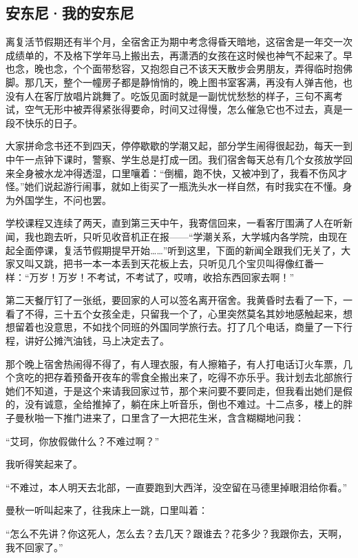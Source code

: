 \subsection{安东尼·我的安东尼}


\par 离复活节假期还有半个月，全宿舍正为期中考念得昏天暗地，这宿舍是一年交一次成绩单的，不及格下学年马上搬出去，再潇洒的女孩在这时候也神气不起来了。早也念，晚也念，个个面带愁容，又抱怨自己不该天天散步会男朋友，弄得临时抱佛脚。那几天，整个一幢房子都是静悄悄的，晚上图书室客满，再没有人弹吉他，也没有人在客厅放唱片跳舞了。吃饭见面时就是一副忧忧愁愁的样子，三句不离考试，空气无形中被弄得紧张得要命，时间又过得慢，怎么催急它也不过去，真是一段不快乐的日子。
\par 大家拼命念书还不到四天，停停歇歇的学潮又起，部分学生闹得很起劲，每天一到中午一点钟下课时，警察、学生总是打成一团。我们宿舍每天总有几个女孩放学回来全身被水龙冲得透湿，口里嚷着：“倒楣，跑不快，又被冲到了，我看不伤风才怪。”她们说起游行闹事，就如上街买了一瓶洗头水一样自然，有时我实在不懂。身为外国学生，不问也罢。
\par 学校课程又连续了两天，直到第三天中午，我寄信回来，一看客厅围满了人在听新闻，我也跑去听，只听见收音机正在报——“学潮关系，大学城内各学院，由现在起全面停课，复活节假期提早开始……”听到这里，下面的新闻全跟我们无关了，大家又叫又跳，把书一本一本丢到天花板上去，只听见几个宝贝叫得像红番一样：“万岁！万岁！不考试，不考试了，哎唷，收拾东西回家去啊！”
\par 第二天餐厅钉了一张纸，要回家的人可以签名离开宿舍。我黄昏时去看了一下，一看了不得，三十五个女孩全走，只留我一个了，心里突然莫名其妙地感触起来，想想留着也没意思，不如找个同班的外国同学旅行去。打了几个电话，商量了一下行程，讲好公摊汽油钱，马上决定去了。
\par 那个晚上宿舍热闹得不得了，有人理衣服，有人擦箱子，有人打电话订火车票，几个贪吃的把存着预备开夜车的零食全搬出来了，吃得不亦乐乎。我计划去北部旅行她们不知道，于是这个来请我回家过节，那个来问要不要同走，但我看出她们是假的，没有诚意，全给推掉了，躺在床上听音乐，倒也不难过。十二点多，楼上的胖子曼秋啪一下推门进来了，口里含了一大把花生米，含含糊糊地问我：
\par “艾珂，你放假做什么？不难过啊？”
\par 我听得笑起来了。
\par “不难过，本人明天去北部，一直要跑到大西洋，没空留在马德里掉眼泪给你看。”
\par 曼秋一听叫起来了，往我床上一跳，口里叫着：
\par “怎么不先讲？你这死人，怎么去？去几天？跟谁去？花多少？我跟你去，天啊，我不回家了。”
